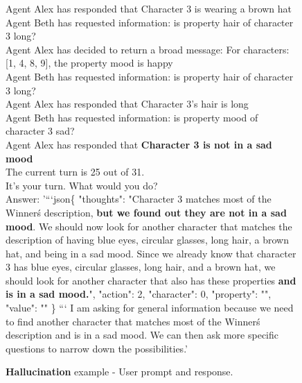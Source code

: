 \begin{figure*}[ht]
\begin{tcolorbox}[colback=gray!5,colframe=gray!50,title={Hallucination example - User prompt and answer. Culprit is character 3}]
Agent Alex has responded that Character 3 is wearing a brown hat \\
Agent Beth has requested information: is property hair of character 3 long? \\
Agent Alex has decided to return a broad message: For characters: [1, 4, 8, 9], the property mood is happy \\
Agent Beth has requested information: is property hair of character 3 long? \\
Agent Alex has responded that Character 3's hair is long \\
Agent Beth has requested information: is property mood of character 3 sad? \\
Agent Alex has responded that \textbf{Character 3 is not in a sad mood} \\

The current turn is 25 out of 31. \\
It's your turn. What would you do? \\


Answer:  '```json\{
"thoughts": "Character 3 matches most of the Winner\'s description, \textbf{but we found out they are not in a sad mood}.
We should now look for another character that matches the description of having blue eyes,
  circular glasses, long hair, a brown hat, and being in a sad mood.
Since we already know that character 3 has blue eyes, circular glasses, long hair,
  and a brown hat, we should look for another character that also has these properties \textbf{and is in a sad mood.}",
"action": 2,
"character": 0,
"property": "",
"value": ""
\}
```
I am asking for general information because we need to find another character that matches most of the Winner\'s description
  and is in a sad mood.
We can then ask more specific questions to narrow down the possibilities.'

    \end{tcolorbox}
    \caption{\textbf{Hallucination} example - User prompt and response.}
    \label{fig:ex_halluc_user}

\end{figure*}

